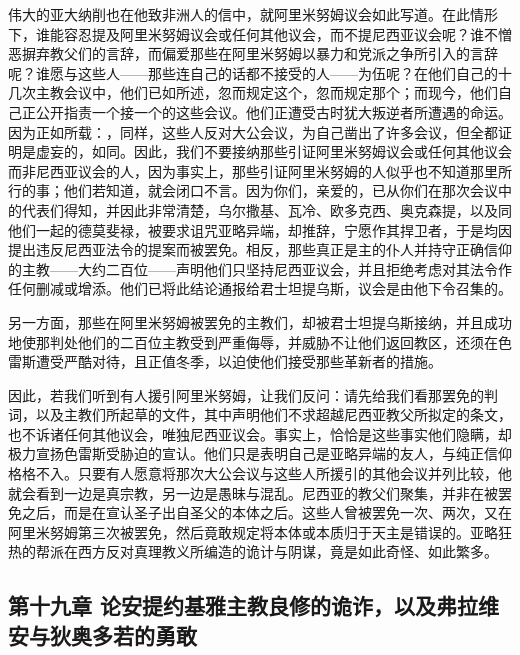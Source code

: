 伟大的亚大纳削也在他致非洲人的信中，就阿里米努姆议会如此写道。在此情形下，谁能容忍提及阿里米努姆议会或任何其他议会，而不提尼西亚议会呢？谁不憎恶摒弃教父们的言辞，而偏爱那些在阿里米努姆以暴力和党派之争所引入的言辞呢？谁愿与这些人——那些连自己的话都不接受的人——为伍呢？在他们自己的十几次主教会议中，他们已如所述，忽而规定这个，忽而规定那个；而现今，他们自己正公开指责一个接一个的这些会议。他们正遭受古时犹大叛逆者所遭遇的命运。因为正如所载：，同样，这些人反对大公会议，为自己凿出了许多会议，但全都证明是虚妄的，如同。因此，我们不要接纳那些引证阿里米努姆议会或任何其他议会而非尼西亚议会的人，因为事实上，那些引证阿里米努姆的人似乎也不知道那里所行的事；他们若知道，就会闭口不言。因为你们，亲爱的，已从你们在那次会议中的代表们得知，并因此非常清楚，乌尔撒基、瓦冷、欧多克西、奥克森提，以及同他们一起的德莫斐禄，被要求诅咒亚略异端，却推辞，宁愿作其捍卫者，于是均因提出违反尼西亚法令的提案而被罢免。相反，那些真正是主的仆人并持守正确信仰的主教——大约二百位——声明他们只坚持尼西亚议会，并且拒绝考虑对其法令作任何删减或增添。他们已将此结论通报给君士坦提乌斯，议会是由他下令召集的。\par

另一方面，那些在阿里米努姆被罢免的主教们，却被君士坦提乌斯接纳，并且成功地使那判处他们的二百位主教受到严重侮辱，并威胁不让他们返回教区，还须在色雷斯遭受严酷对待，且正值冬季，以迫使他们接受那些革新者的措施。\par

因此，若我们听到有人援引阿里米努姆，让我们反问：请先给我们看那罢免的判词，以及主教们所起草的文件，其中声明他们不求超越尼西亚教父所拟定的条文，也不诉诸任何其他议会，唯独尼西亚议会。事实上，恰恰是这些事实他们隐瞒，却极力宣扬色雷斯受胁迫的宣认。他们只是表明自己是亚略异端的友人，与纯正信仰格格不入。只要有人愿意将那次大公会议与这些人所援引的其他会议并列比较，他就会看到一边是真宗教，另一边是愚昧与混乱。尼西亚的教父们聚集，并非在被罢免之后，而是在宣认圣子出自圣父的本体之后。这些人曾被罢免一次、两次，又在阿里米努姆第三次被罢免，然后竟敢规定将本体或本质归于天主是错误的。亚略狂热的帮派在西方反对真理教义所编造的诡计与阴谋，竟是如此奇怪、如此繁多。\par


\subsection{第十九章 论安提约基雅主教良修的诡诈，以及弗拉维安与狄奥多若的勇敢}

